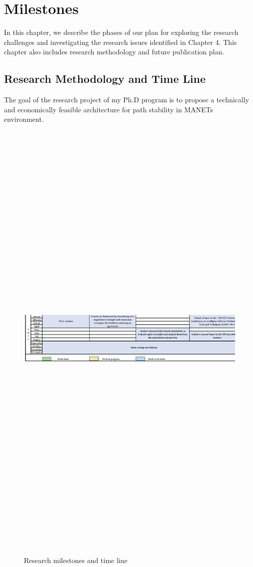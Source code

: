 \setcounter{chapter}{5}
\chapter{Milestones}
In this chapter, we describe the phases of our plan for exploring the research challenges and investigating the research issues identified in Chapter 4. This chapter also includes research methodology and future publication plan.

\section {Research Methodology and Time Line}

    \par The goal of the research project of my Ph.D program is to propose a technically and economically feasible architecture for path stability in MANETs environment.

    \begin{figure}
                \begin{center}
                \includegraphics[width=16cm, height=22cm]{Figures/timetable.eps}\label{Timetable}
                \caption{Research milestones and time line}
                \end{center}
\end{figure}

